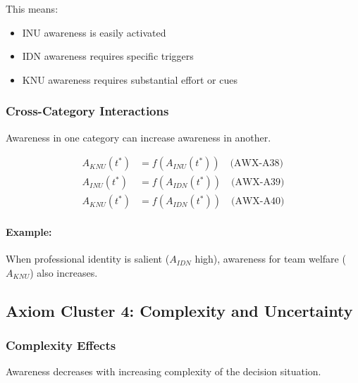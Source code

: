 This means:
\begin{itemize}
\item INU awareness is easily activated
\item IDN awareness requires specific triggers
\item KNU awareness requires substantial effort or cues
\end{itemize}

\subsubsection{Cross-Category Interactions}

\begin{axiom}
\label{ax:awx-interactions}
Awareness in one category can increase awareness in another.
\end{axiom}

\begin{align}
A_{KNU}(t^*) &= f(A_{INU}(t^*)) \quad \text{(AWX-A38)} \\
A_{INU}(t^*) &= f(A_{IDN}(t^*)) \quad \text{(AWX-A39)} \\
A_{KNU}(t^*) &= f(A_{IDN}(t^*)) \quad \text{(AWX-A40)}
\end{align}

\paragraph{Example:}
When professional identity is salient ($A_{IDN}$ high), awareness for 
team welfare ($A_{KNU}$) also increases.

\subsection{Axiom Cluster 4: Complexity and Uncertainty}
\label{subsec:axioms-complexity}

\subsubsection{Complexity Effects}

\begin{axiom}
\label{ax:awx-a46}
Awareness decreases with increasing complexity of the decision situation.
\end{axiom}

